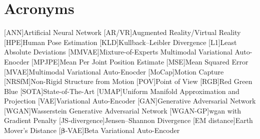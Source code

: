 \chapter*{Acronyms}

\begin{acronym}[TBD]
    [ANN]{Artificial Neural Network}
    [AR/VR]{Augmented Reality/Virtual Reality}
    [HPE]{Human Pose Estimation}
    [KLD]{Kullback–Leibler Divergence}
    [L1]{Least Absolute Deviations}
    [MMVAE]{Mixture-of-Experts Multimodal Variational Auto-Enocder}
    [MPJPE]{Mean Per Joint Position Estimate}
    [MSE]{Mean Squared Error}
    [MVAE]{Multimodal Variational Auto-Enocder}
    [MoCap]{Motion Capture}
    [NRSfM]{Non-Rigid Structure from Motion}
    [POV]{Point of View}
    [RGB]{Red Green Blue}
    [SOTA]{State-of-The-Art}
    [UMAP]{Uniform Manifold Approximation and Projection}
    [VAE]{Variational Auto-Encoder}
    [GAN]{Generative Adversarial Network}
    [WGAN]{Wasserstein Generative Adversarial Network}
    [WGAN-GP]{\ac{wgan} with Gradient Penalty}
    [JS-divergence]{Jensen–Shannon Divergence}
    [EM distance]{Earth Mover's Distance}
    [$\boldsymbol{\beta}$-VAE]{Beta Variational Auto-Encoder}

\end{acronym}

